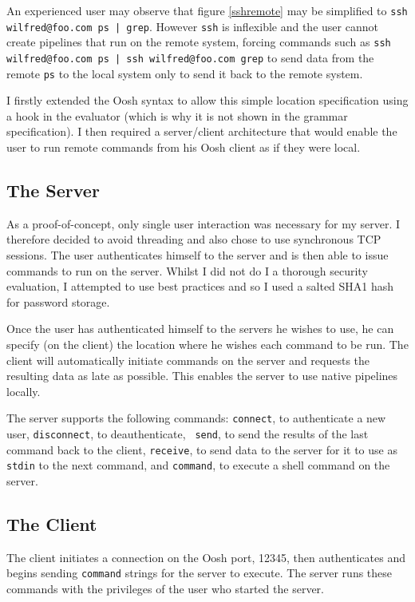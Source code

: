 \documentclass[12pt,twoside,notitlepage]{report}
\begin{document}
An experienced user may observe that figure \ref{sshremote} may be
simplified to {\tt ssh wilfred@foo.com ps | grep}. However {\tt ssh}
is inflexible and the user cannot create pipelines that run on the
remote system, forcing commands such as {\tt ssh wilfred@foo.com ps |
  ssh wilfred@foo.com grep} to send data from the remote {\tt ps} to the
local system only to send it back to the remote system.

I firstly extended the Oosh syntax to allow this simple location
specification using a hook in the evaluator (which is why it is not
shown in the grammar specification). I then required a server/client
architecture that would enable the user to run remote commands from
his Oosh client as if they were local.

\subsection{The Server}
As a proof-of-concept, only single user interaction was necessary for
my server. I therefore decided to avoid threading and also chose to
use synchronous TCP sessions. The user authenticates himself to the
server and is then able to issue commands to run on the server. Whilst
I did not do I a thorough security evaluation, I attempted to use best
practices and so I used a salted SHA1 hash for password storage.

Once the user has authenticated himself to the servers he wishes to
use, he can specify (on the client) the location where he wishes each
command to be run. The client will automatically initiate commands on the
server and requests the resulting data as late as possible. This
enables the server to use native pipelines locally.

The server supports the following commands: {\tt connect}, to
authenticate a new user, {\tt disconnect}, to deauthenticate, {\tt
  send}, to send the results of the last command back to the client,
{\tt receive}, to send data to the server for it to use as {\tt stdin}
to the next command, and {\tt command}, to execute a shell command on
the server.

\subsection{The Client}
The client initiates a connection on the Oosh port, 12345, then
authenticates and begins sending {\tt command} strings for the server
to execute. The server runs these commands with the privileges of the
user who started the server.
\end{document}
